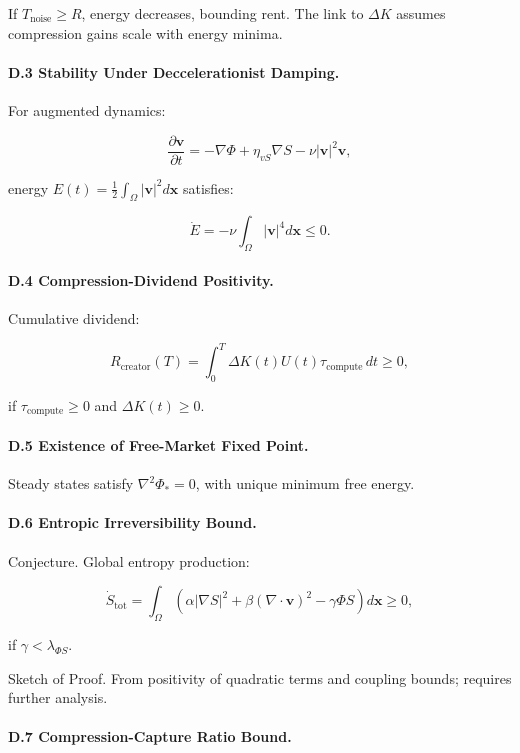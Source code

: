 \documentclass[12pt]{article}
\begin{document}
If \( T_{\text{noise}} \geq R \), energy decreases, bounding rent. The link to \(\Delta K\) assumes compression gains scale with energy minima.

\paragraph{D.3 Stability Under Deccelerationist Damping.}

For augmented dynamics:

\[
\frac{\partial \mathbf{v}}{\partial t} = -\nabla \Phi + \eta_{vS} \nabla S - \nu |\mathbf{v}|^2 \mathbf{v},
\]

energy \( E(t) = \tfrac{1}{2} \int_\Omega |\mathbf{v}|^2 d\mathbf{x} \) satisfies:

\[
\dot{E} = - \nu \int_\Omega |\mathbf{v}|^4 d\mathbf{x} \leq 0.
\]

\paragraph{D.4 Compression-Dividend Positivity.}

Cumulative dividend:

\[
R_{\text{creator}}(T) = \int_0^T \Delta K(t) U(t) \tau_{\text{compute}} \, dt \geq 0,
\]

if \(\tau_{\text{compute}} \geq 0\) and \(\Delta K(t) \geq 0\).

\paragraph{D.5 Existence of Free-Market Fixed Point.}

Steady states satisfy \(\nabla^2 \Phi_* = 0\), with unique minimum free energy.

\paragraph{D.6 Entropic Irreversibility Bound.}

Conjecture. Global entropy production:

\[
\dot{S}_{\text{tot}} = \int_\Omega (\alpha |\nabla S|^2 + \beta (\nabla \cdot \mathbf{v})^2 - \gamma \Phi S) d\mathbf{x} \geq 0,
\]

if \(\gamma < \lambda_{\Phi S}\).

Sketch of Proof. From positivity of quadratic terms and coupling bounds; requires further analysis.

\paragraph{D.7 Compression-Capture Ratio Bound.}
\end{document}
